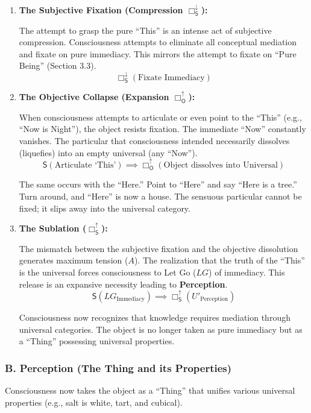 \documentclass[12pt]{book}
\newcommand{\SBoxUp}{\Box_{\mathsf{S}}^{\uparrow}}
\newcommand{\SBoxDown}{\Box_{\mathsf{S}}^{\downarrow}}
\newcommand{\OBoxUp}{\Box_{\mathsf{O}}^{\uparrow}}
\begin{document}
\begin{enumerate}
\item \textbf{The Subjective Fixation (Compression $\SBoxDown$):}

The attempt to grasp the pure ``This'' is an intense act of subjective compression. Consciousness attempts to eliminate all conceptual mediation and fixate on pure immediacy. This mirrors the attempt to fixate on ``Pure Being'' (Section 3.3).
\[
\SBoxDown(\text{Fixate Immediacy})
\]

\item \textbf{The Objective Collapse (Expansion $\OBoxUp$):}

When consciousness attempts to articulate or even point to the ``This'' (e.g., ``Now is Night''), the object resists fixation. The immediate ``Now'' constantly vanishes. The particular that consciousness intended necessarily dissolves (liquefies) into an empty universal (any ``Now'').
\[
\mathsf{S}(\text{Articulate `This'}) \implies \OBoxUp(\text{Object dissolves into Universal})
\]

The same occurs with the ``Here.'' Point to ``Here'' and say ``Here is a tree.'' Turn around, and ``Here'' is now a house. The sensuous particular cannot be fixed; it slips away into the universal category.

\item \textbf{The Sublation ($\SBoxUp$):}

The mismatch between the subjective fixation and the objective dissolution generates maximum tension ($A$). The realization that the truth of the ``This'' is the universal forces consciousness to Let Go ($LG$) of immediacy. This release is an expansive necessity leading to \textbf{Perception}.
\[
\mathsf{S}(LG_{\text{Immediacy}}) \implies \SBoxUp(U'_{\text{Perception}})
\]

Consciousness now recognizes that knowledge requires mediation through universal categories. The object is no longer taken as pure immediacy but as a ``Thing'' possessing universal properties.
\end{enumerate}

\subsubsection{B. Perception (The Thing and its Properties)}

Consciousness now takes the object as a ``Thing'' that unifies various universal properties (e.g., salt is white, tart, and cubical).
\end{document}

